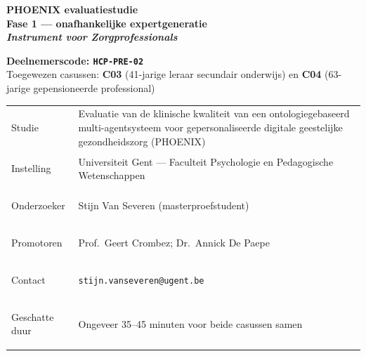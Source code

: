 \documentclass[11pt,a4paper]{article}
\renewcommand{\arraystretch}{1.28}
\begin{document}
\begin{titlepage}
\centering\vspace*{0.6cm}

\begin{tcolorbox}[
  colback=DarkBlue,colframe=DarkBlue,
  arc=3mm,left=14pt,right=14pt,top=12pt,bottom=12pt,
  width=\textwidth
]
\centering
{\fontsize{22}{28}\selectfont\bfseries\color{white}
PHOENIX evaluatiestudie\\[0.3em]
\fontsize{15}{20}\selectfont\color{AccentBlue}
Fase 1 --- onafhankelijke expertgeneratie\\[0.2em]
\fontsize{12}{16}\selectfont\color{white}
\textit{Instrument voor Zorgprofessionals}
}
\end{tcolorbox}

\vspace{0.7cm}

\begin{tcolorbox}[
  colback=AccentBlue,colframe=PrimaryBlue,
  arc=2.5mm,boxrule=1.2pt,left=12pt,right=12pt,top=10pt,bottom=10pt,
  width=0.86\textwidth
]
\centering
{\large\bfseries\color{DarkBlue}Deelnemerscode: \texttt{HCP-PRE-02}}\\[0.5em]
{\normalsize\color{SlateMid}
Toegewezen casussen:\quad
\textbf{\color{PrimaryBlue}C03} (41-jarige leraar secundair onderwijs)
\quad en \quad
\textbf{\color{PrimaryBlue}C04} (63-jarige gepensioneerde professional)
}
\end{tcolorbox}

\vspace{0.6cm}

\begin{tcolorbox}[
  colback=SoftBG,colframe=BorderGrey,
  arc=2mm,left=10pt,right=10pt,top=9pt,bottom=9pt,
  width=0.92\textwidth
]
\small\renewcommand{\arraystretch}{1.28}
\begin{tabularx}{\textwidth}{@{}>{\bfseries\raggedright\arraybackslash}p{}X@{}}
Studie & Evaluatie van de klinische kwaliteit van een ontologiegebaseerd multi-agentsysteem voor gepersonaliseerde digitale geestelijke gezondheidszorg (PHOENIX) \\
Instelling & Universiteit Gent --- Faculteit Psychologie en Pedagogische Wetenschappen \\
Onderzoeker & Stijn Van Severen (masterproefstudent) \\
Promotoren & Prof.\ Geert Crombez; Dr.\ Annick De Paepe \\
Contact & \texttt{stijn.vanseveren@ugent.be} \\
Geschatte duur & Ongeveer 35--45 minuten voor beide casussen samen \\
\end{tabularx}
\end{tcolorbox}


\end{titlepage}
\end{document}
